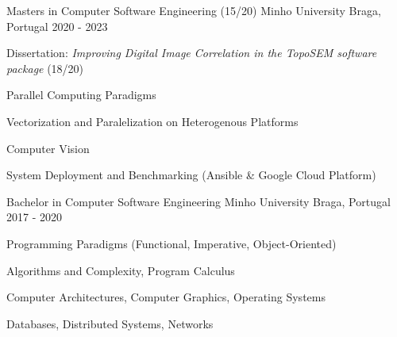 
\begin{cventries}


\cventry
  {Masters in Computer Software Engineering (15/20)} %
{Minho University} %
{Braga, Portugal} %
{2020 - 2023} %
{ %
\begin{cvitems}
\item{Dissertation: \textit{Improving Digital Image Correlation in the TopoSEM software package} (18/20)}
\item{Parallel Computing Paradigms}
\item{Vectorization and Paralelization on Heterogenous Platforms}
\item{Computer Vision}
\item{System Deployment and Benchmarking (Ansible \& Google Cloud Platform)}
\end{cvitems}
}


\cventry
  {Bachelor in Computer Software Engineering} %
{Minho University} %
{Braga, Portugal} %
{2017 - 2020} %
{ %
\begin{cvitems}
\item{Programming Paradigms (Functional, Imperative, Object-Oriented)}
\item{Algorithms and Complexity, Program Calculus}
\item{Computer Architectures, Computer Graphics, Operating Systems}
\item{Databases, Distributed Systems, Networks}
\end{cvitems}
}



\end{cventries}
